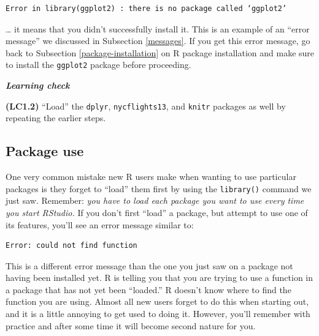 \documentclass[]{book}
\begin{document}
\begin{verbatim}
Error in library(ggplot2) : there is no package called ‘ggplot2’
\end{verbatim}

\ldots{} it means that you didn't successfully install it. This is an example of an ``error message'' we discussed in Subsection \ref{messages}. If you get this error message, go back to Subsection \ref{package-installation} on R package installation and make sure to install the \texttt{ggplot2} package before proceeding.

\begin{learncheck}
\vspace{-0.25in}

\textbf{\emph{Learning check}} \vspace{-0.25in}
\end{learncheck}

\textbf{(LC1.2)} ``Load'' the \texttt{dplyr}, \texttt{nycflights13}, and \texttt{knitr} packages as well by repeating the earlier steps.

\begin{learncheck}
\vspace{-0.25in}
\vspace{-0.25in}
\end{learncheck}

\hypertarget{package-use}{%
\subsection{Package use}\label{package-use}}

One very common mistake new R users make when wanting to use particular packages is they forget to ``load'' them first by using the \texttt{library()} command we just saw. Remember: \emph{you have to load each package you want to use every time you start RStudio.} If you don't first ``load'' a package, but attempt to use one of its features, you'll see an error message similar to:

\begin{verbatim}
Error: could not find function
\end{verbatim}

This is a different error message than the one you just saw on a package not having been installed yet. R is telling you that you are trying to use a function in a package that has not yet been ``loaded.'' R doesn't know where to find the function you are using. Almost all new users forget to do this when starting out, and it is a little annoying to get used to doing it. However, you'll remember with practice and after some time it will become second nature for you.
\end{document}
